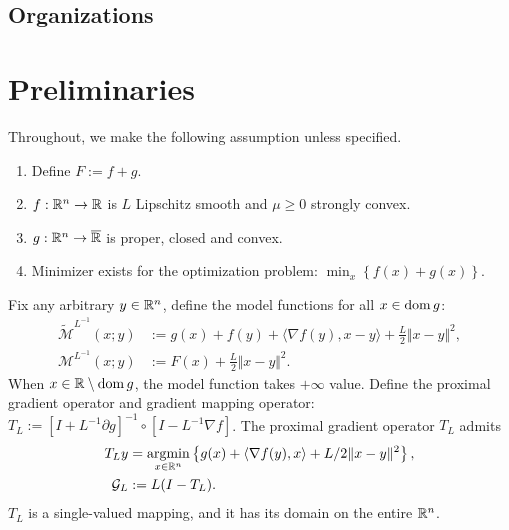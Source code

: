 \documentclass[12pt]{article}
\begin{document}
    \subsection{Organizations}
    
       

\section{Preliminaries}
    Throughout, we make the following assumption unless specified. 
    \begin{assumption}\label{ass:smooth-nsmooth-additive}
        \;
        \begin{enumerate}
            \item Define $F := f + g$. 
            \item $f: \mathbb R^n \rightarrow \mathbb R$ is $L$ Lipschitz smooth and $\mu \ge 0$ strongly convex. 
            \item $g: \mathbb R^n \rightarrow \overline {\mathbb R}$ is proper, closed and convex. 
            \item Minimizer exists for the optimization problem: $\min_x \left\lbrace f(x) + g(x)\right\rbrace$. 
        \end{enumerate}
    \end{assumption}
    Fix any arbitrary $y \in \mathbb R^n$, define the model functions for all $x \in \operatorname{dom} g$: 
    \begin{align*}
        \widetilde{\mathcal M}^{L^{-1}}
        (x; y) 
        &:=
        g(x) + f(y) + \langle \nabla f(y), x - y\rangle 
        + \frac{L}{2}\Vert x - y\Vert^2, 
        \\
        \mathcal M^{L^{-1}}(x; y) &:= F(x) + \frac{L}{2}\Vert x - y\Vert^2. 
    \end{align*}
    When $x \in \mathbb R\setminus \operatorname{dom} g$, the model function takes $+\infty$ value. 
    Define the proximal gradient operator and gradient mapping operator:  $T_L := [I + L^{-1}\partial g]^{-1}\circ [I - L^{-1}\nabla f]$. 
    The proximal gradient operator $T_L$ admits 
    \begin{align*}
        T_Ly &= \mathop{\rm argmin}\limits_{x \in \mathbb R^n} \left\lbrace
            g(x) + \langle \nabla f(y), x\rangle + L/2\Vert x - y\Vert^2
        \right\rbrace,
        \\
        \mathcal G_L 
        &:= L(I - T_L). 
    \end{align*}
    $T_L$ is a single-valued mapping, and it has its domain on the entire $\mathbb R^n$. 
\end{document}
